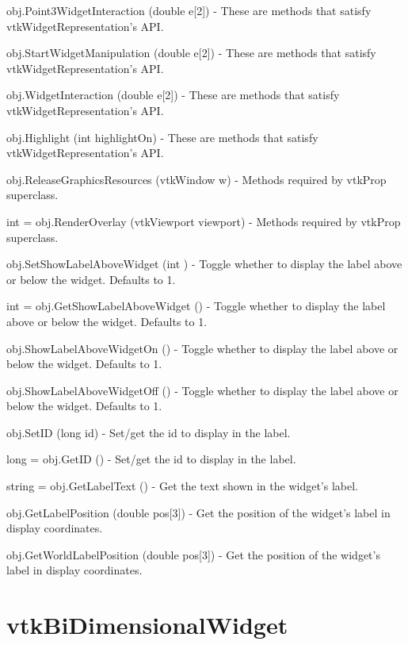 \begin{DoxyItemize}
\item {\ttfamily obj.\-Point3\-Widget\-Interaction (double e\mbox{[}2\mbox{]})} -\/ These are methods that satisfy vtk\-Widget\-Representation's A\-P\-I.  
\item {\ttfamily obj.\-Start\-Widget\-Manipulation (double e\mbox{[}2\mbox{]})} -\/ These are methods that satisfy vtk\-Widget\-Representation's A\-P\-I.  
\item {\ttfamily obj.\-Widget\-Interaction (double e\mbox{[}2\mbox{]})} -\/ These are methods that satisfy vtk\-Widget\-Representation's A\-P\-I.  
\item {\ttfamily obj.\-Highlight (int highlight\-On)} -\/ These are methods that satisfy vtk\-Widget\-Representation's A\-P\-I.  
\item {\ttfamily obj.\-Release\-Graphics\-Resources (vtk\-Window w)} -\/ Methods required by vtk\-Prop superclass.  
\item {\ttfamily int = obj.\-Render\-Overlay (vtk\-Viewport viewport)} -\/ Methods required by vtk\-Prop superclass.  
\item {\ttfamily obj.\-Set\-Show\-Label\-Above\-Widget (int )} -\/ Toggle whether to display the label above or below the widget. Defaults to 1.  
\item {\ttfamily int = obj.\-Get\-Show\-Label\-Above\-Widget ()} -\/ Toggle whether to display the label above or below the widget. Defaults to 1.  
\item {\ttfamily obj.\-Show\-Label\-Above\-Widget\-On ()} -\/ Toggle whether to display the label above or below the widget. Defaults to 1.  
\item {\ttfamily obj.\-Show\-Label\-Above\-Widget\-Off ()} -\/ Toggle whether to display the label above or below the widget. Defaults to 1.  
\item {\ttfamily obj.\-Set\-I\-D (long id)} -\/ Set/get the id to display in the label.  
\item {\ttfamily long = obj.\-Get\-I\-D ()} -\/ Set/get the id to display in the label.  
\item {\ttfamily string = obj.\-Get\-Label\-Text ()} -\/ Get the text shown in the widget's label.  
\item {\ttfamily obj.\-Get\-Label\-Position (double pos\mbox{[}3\mbox{]})} -\/ Get the position of the widget's label in display coordinates.  
\item {\ttfamily obj.\-Get\-World\-Label\-Position (double pos\mbox{[}3\mbox{]})} -\/ Get the position of the widget's label in display coordinates.  
\end{DoxyItemize}\hypertarget{vtkwidgets_vtkbidimensionalwidget}{}\section{vtk\-Bi\-Dimensional\-Widget}\label{vtkwidgets_vtkbidimensionalwidget}
